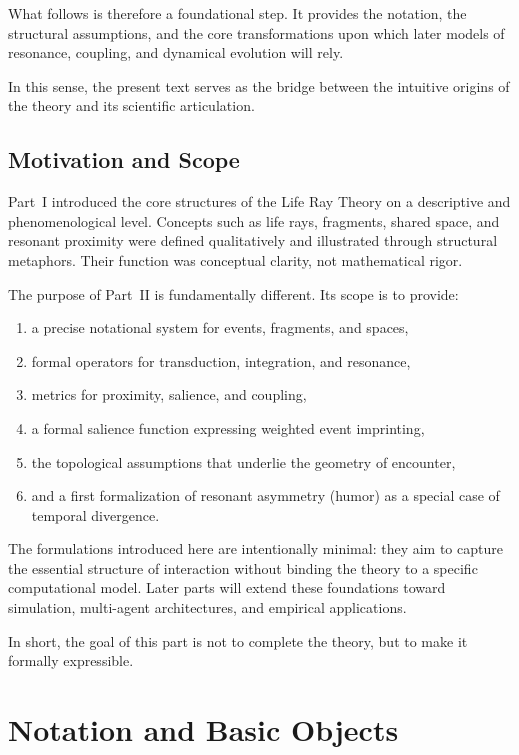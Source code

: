 \documentclass[12pt,a4paper]{article}
\begin{document}
What follows is therefore a foundational step. It provides the notation, the structural
assumptions, and the core transformations upon which later models of resonance,
coupling, and dynamical evolution will rely. 

In this sense, the present text serves as the
bridge between the intuitive origins of the theory and its scientific articulation.

\subsection{Motivation and Scope}
Part~I introduced the core structures of the Life Ray Theory on a descriptive and
phenomenological level. Concepts such as life rays, fragments, shared space, and
resonant proximity were defined qualitatively and illustrated through structural
metaphors. Their function was conceptual clarity, not mathematical rigor.

The purpose of Part~II is fundamentally different. Its scope is to provide:
\begin{enumerate}
    \item a precise notational system for events, fragments, and spaces,
    \item formal operators for transduction, integration, and resonance,
    \item metrics for proximity, salience, and coupling,
    \item a formal salience function expressing weighted event imprinting,
    \item the topological assumptions that underlie the geometry of encounter,
    \item and a first formalization of resonant asymmetry (humor) as a 
          special case of temporal divergence.
\end{enumerate}

The formulations introduced here are intentionally minimal: they aim to capture the
essential structure of interaction without binding the theory to a specific
computational model. Later parts will extend these foundations toward simulation,
multi-agent architectures, and empirical applications.

In short, the goal of this part is not to complete the theory, but to make it formally
expressible.

\section{Notation and Basic Objects}
\end{document}
